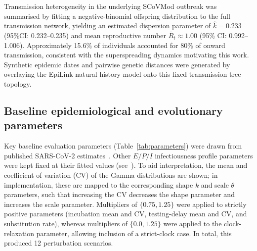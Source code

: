 \documentclass[10pt,letterpaper]{article}
\begin{document}
Transmission heterogeneity in the underlying SCoVMod outbreak was summarised by fitting a negative-binomial offspring distribution to the full transmission network, yielding an estimated dispersion parameter of $\hat{k} = 0.233$ (95\%CI: 0.232--0.235) and mean reproductive number $\bar{R}_t \approx 1.00$ (95\% CI: 0.992--1.006). Approximately 15.6\% of individuals accounted for 80\% of onward transmission, consistent with the superspreading dynamics motivating this work\@. Synthetic epidemic dates and pairwise genetic distances were generated by overlaying the EpiLink natural-history model onto this fixed transmission tree topology.  %

\subsection*{Baseline epidemiological and evolutionary parameters}

Key baseline evaluation parameters (Table~\ref{tab:parameters}) were drawn from published SARS-CoV-2 estimates~\cite{Hart2021, Duchene2020, vanDorp2020}. Other $E/P/I$ infectiousness profile parameters were kept fixed at their fitted values (see~). To aid interpretation, the mean and coefficient of variation (CV) of the Gamma distributions are shown; in implementation, these are mapped to the corresponding shape $k$ and scale $\theta$ parameters, such that increasing the CV decreases the shape parameter and increases the scale parameter. Multipliers of $\{0.75, 1.25\}$ were applied to strictly positive parameters (incubation mean and CV, testing-delay mean and CV, and substitution rate), whereas multipliers of $\{0.0, 1.25\}$ were applied to the clock-relaxation parameter, allowing inclusion of a strict-clock case. In total, this produced 12 perturbation scenarios.
\end{document}
